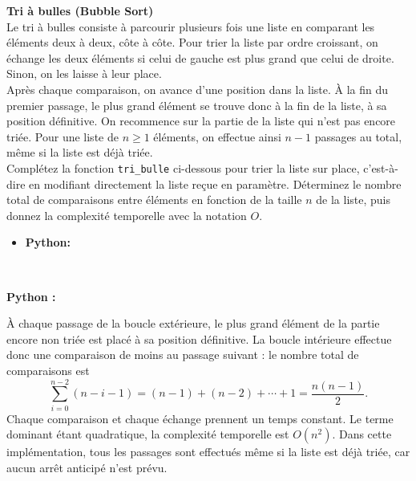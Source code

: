 \begin{Exercice} [20 minutes] [Python] \textbf{Tri à bulles (Bubble Sort)} \\
    Le tri à bulles consiste à parcourir plusieurs fois une liste en comparant les éléments deux à deux, côte à côte. Pour trier la liste par ordre croissant, on échange les deux éléments si celui de gauche est plus grand que celui de droite. Sinon, on les laisse à leur place.\\

    Après chaque comparaison, on avance d'une position dans la liste. À la fin du premier passage, le plus grand élément se trouve donc à la fin de la liste, à sa position définitive. On recommence sur la partie de la liste qui n'est pas encore triée. Pour une liste de $n \geq 1$ éléments, on effectue ainsi $n-1$ passages au total, même si la liste est déjà triée. \\

    Complétez la fonction \texttt{tri\_bulle} ci-dessous pour trier la liste sur place, c'est-à-dire en modifiant directement la liste reçue en paramètre. Déterminez le nombre total de comparaisons entre éléments en fonction de la taille $n$ de la liste, puis donnez la complexité temporelle avec la notation $O$.
    
    \begin{itemize}
            \item \textbf{Python:}
                 
        \end{itemize}
       
        \ \\
        
        \begin{solution}
        \textbf{Python :}
        
    \end{solution}
    \begin{solution}
        À chaque passage de la boucle extérieure, le plus grand élément de la partie encore non triée est placé à sa position définitive. La boucle intérieure effectue donc une comparaison de moins au passage suivant : le nombre total de comparaisons est
        \[
            \sum_{i=0}^{n-2} (n-i-1) = (n-1) + (n-2) + \cdots + 1 = \frac{n(n-1)}{2}.
        \]
        Chaque comparaison et chaque échange prennent un temps constant. Le terme dominant étant quadratique, la complexité temporelle est $O(n^2)$. Dans cette implémentation, tous les passages sont effectués même si la liste est déjà triée, car aucun arrêt anticipé n'est prévu.
    \end{solution}
    
    \end{Exercice}

